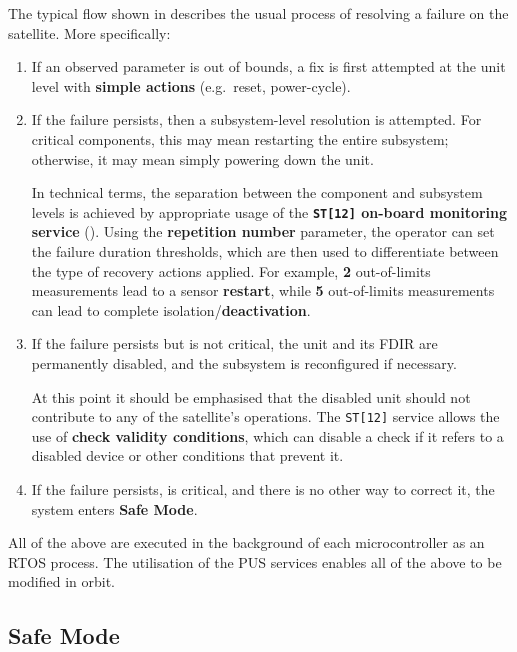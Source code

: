 \documentclass[a4paper,nobib,final]{tufte-book}
\begin{document}
The typical flow shown in  describes the usual process of resolving a failure on the satellite. More specifically:
\begin{enumerate}
	\item If an observed parameter is out of bounds, a fix is first attempted at the unit level with \textbf{simple actions} (e.g.\ reset, power-cycle).
	\item If the failure persists, then a subsystem-level resolution is attempted. For critical components, this may mean restarting the entire subsystem; otherwise, it may mean simply powering down the unit.
	
	In technical terms, the separation between the component and subsystem levels is achieved by appropriate usage of the \textbf{\texttt{ST[12]} on-board monitoring service} (). Using the \textbf{repetition number} parameter, the operator can set the failure duration thresholds, which are then used to differentiate between the type of recovery actions applied. 	
	For example, \textbf{2} out-of-limits measurements lead to a sensor \textbf{restart}, while \textbf{5} out-of-limits measurements can lead to complete isolation/\textbf{deactivation}.

	\item If the failure persists but is not critical, the unit and its \acs{FDIR} are permanently disabled, and the subsystem is reconfigured if necessary.
	
	At this point it should be emphasised that the disabled unit should not contribute to any of the satellite's operations. The \texttt{ST[12]} service allows the use of \textbf{check validity conditions}, which can disable a check if it refers to a disabled device or other conditions that prevent it.
	\item If the failure persists, is critical, and there is no other way to correct it, the system enters \textbf{Safe Mode}.
\end{enumerate}

All of the above are executed in the background of each microcontroller as an \acs{RTOS} process. The utilisation of the \acs{PUS} services enables all of the above to be modified in orbit.

\subsection{Safe Mode}
\label{itm:safe_mode}
\end{document}
